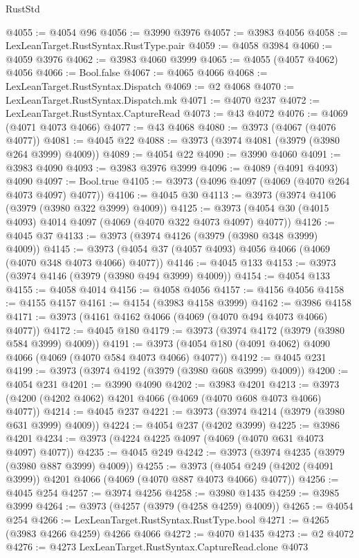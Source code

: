 \begin{lexlean}{RustStd}
\begin{coremodule}
@4055 := @4054 @96
@4056 := @3990 @3976
@4057 := @3983 @4056
@4058 := LexLeanTarget.RustSyntax.RustType.pair
@4059 := @4058 @3984
@4060 := @4059 @3976
@4062 := @3983 @4060 @3999
@4065 := @4055 (@4057 @4062) @4056
@4066 := Bool.false
@4067 := @4065 @4066
@4068 := LexLeanTarget.RustSyntax.Dispatch
@4069 := @2 @4068
@4070 := LexLeanTarget.RustSyntax.Dispatch.mk
@4071 := @4070 @237
@4072 := LexLeanTarget.RustSyntax.CaptureRead
@4073 := @43 @4072
@4076 := @4069 (@4071 @4073 @4066)
@4077 := @43 @4068
@4080 := @3973 (@4067 (@4076 @4077))
@4081 := @4045 @22
@4088 := @3973 (@3974 @4081 (@3979 (@3980 @264 @3999) @4009))
@4089 := @4054 @22
@4090 := @3990 @4060
@4091 := @3983 @4090
@4093 := @3983 @3976 @3999
@4096 := @4089 (@4091 @4093) @4090
@4097 := Bool.true
@4105 := @3973 (@4096 @4097 (@4069 (@4070 @264 @4073 @4097) @4077))
@4106 := @4045 @30
@4113 := @3973 (@3974 @4106 (@3979 (@3980 @322 @3999) @4009))
@4125 := @3973 (@4054 @30 (@4015 @4093) @4014 @4097 (@4069 (@4070 @322 @4073 @4097) @4077))
@4126 := @4045 @37
@4133 := @3973 (@3974 @4126 (@3979 (@3980 @348 @3999) @4009))
@4145 := @3973 (@4054 @37 (@4057 @4093) @4056 @4066 (@4069 (@4070 @348 @4073 @4066) @4077))
@4146 := @4045 @133
@4153 := @3973 (@3974 @4146 (@3979 (@3980 @494 @3999) @4009))
@4154 := @4054 @133
@4155 := @4058 @4014
@4156 := @4058 @4056
@4157 := @4156 @4056
@4158 := @4155 @4157
@4161 := @4154 (@3983 @4158 @3999)
@4162 := @3986 @4158
@4171 := @3973 (@4161 @4162 @4066 (@4069 (@4070 @494 @4073 @4066) @4077))
@4172 := @4045 @180
@4179 := @3973 (@3974 @4172 (@3979 (@3980 @584 @3999) @4009))
@4191 := @3973 (@4054 @180 (@4091 @4062) @4090 @4066 (@4069 (@4070 @584 @4073 @4066) @4077))
@4192 := @4045 @231
@4199 := @3973 (@3974 @4192 (@3979 (@3980 @608 @3999) @4009))
@4200 := @4054 @231
@4201 := @3990 @4090
@4202 := @3983 @4201
@4213 := @3973 (@4200 (@4202 @4062) @4201 @4066 (@4069 (@4070 @608 @4073 @4066) @4077))
@4214 := @4045 @237
@4221 := @3973 (@3974 @4214 (@3979 (@3980 @631 @3999) @4009))
@4224 := @4054 @237 (@4202 @3999)
@4225 := @3986 @4201
@4234 := @3973 (@4224 @4225 @4097 (@4069 (@4070 @631 @4073 @4097) @4077))
@4235 := @4045 @249
@4242 := @3973 (@3974 @4235 (@3979 (@3980 @887 @3999) @4009))
@4255 := @3973 (@4054 @249 (@4202 (@4091 @3999)) @4201 @4066 (@4069 (@4070 @887 @4073 @4066) @4077))
@4256 := @4045 @254
@4257 := @3974 @4256
@4258 := @3980 @1435
@4259 := @3985 @3999
@4264 := @3973 (@4257 (@3979 (@4258 @4259) @4009))
@4265 := @4054 @254
@4266 := LexLeanTarget.RustSyntax.RustType.bool
@4271 := @4265 (@3983 @4266 @4259) @4266 @4066
@4272 := @4070 @1435
@4273 := @2 @4072
@4276 := @4273 LexLeanTarget.RustSyntax.CaptureRead.clone @4073

\end{coremodule}
\end{lexlean}
